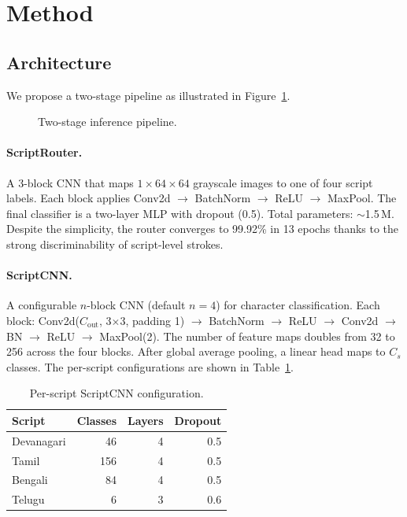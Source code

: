 \documentclass[10pt,twocolumn]{article}
\begin{document}
\section{Method}

\subsection{Architecture}

We propose a two-stage pipeline as illustrated in Figure~\ref{fig:pipeline}.

\begin{figure}[H]
\centering
{}
\caption{Two-stage inference pipeline.}
\label{fig:pipeline}
\end{figure}

\paragraph{ScriptRouter.}
A 3-block CNN that maps $1\times64\times64$ grayscale images to one of four
script labels.  Each block applies Conv2d $\to$ BatchNorm $\to$ ReLU $\to$
MaxPool.  The final classifier is a two-layer MLP with dropout (0.5).
Total parameters: $\sim$1.5\,M.  Despite the simplicity, the router converges
to 99.92\% in 13 epochs thanks to the strong discriminability of script-level
strokes.

\paragraph{ScriptCNN.}
A configurable $n$-block CNN (default $n=4$) for character classification.
Each block: Conv2d($C_\text{out}$, 3$\times$3, padding 1) $\to$ BatchNorm
$\to$ ReLU $\to$ Conv2d $\to$ BN $\to$ ReLU $\to$ MaxPool(2).  The number of
feature maps doubles from 32 to 256 across the four blocks.  After global
average pooling, a linear head maps to $C_s$ classes.  The per-script
configurations are shown in Table~\ref{tab:configs}.

\begin{table}[H]
\centering
\caption{Per-script ScriptCNN configuration.}
\label{tab:configs}
\small
\begin{tabular}{lrrr}
\toprule
Script & Classes & Layers & Dropout \\
\midrule
Devanagari & 46  & 4 & 0.5 \\
Tamil      & 156 & 4 & 0.5 \\
Bengali    & 84  & 4 & 0.5 \\
Telugu     & 6   & 3 & 0.6 \\
\bottomrule
\end{tabular}
\end{table}
\end{document}

